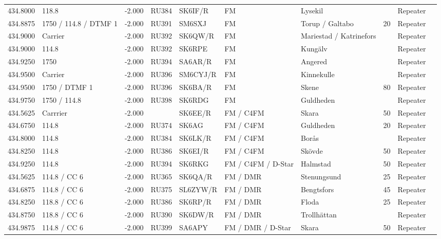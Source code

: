 \begin{longtable}{lllllllrlr}
434.8000&118.8&-2.000&RU384&SK6IF/R&FM&Lysekil&&Repeater&\\
434.8875&1750 / 114.8 / DTMF 1&-2.000&RU391&SM6SXJ&FM&Torup / Galtabo&20&Repeater&\\
434.9000&Carrier&-2.000&RU392&SK6QW/R&FM&Mariestad / Katrinefors&&Repeater&\\
434.9000&114.8&-2.000&RU392&SK6RPE&FM&Kungälv&&Repeater&\\
434.9250&1750&-2.000&RU394&SA6AR/R&FM&Angered&&Repeater&\\
434.9500&Carrier&-2.000&RU396&SM6CYJ/R&FM&Kinnekulle&&Repeater&\\
434.9500&1750 / DTMF 1&-2.000&RU396&SK6BA/R&FM&Skene&80&Repeater&\\
434.9750&1750 / 114.8&-2.000&RU398&SK6RDG&FM&Guldheden&&Repeater&\\
434.5625&Carrrier&-2.000&&SK6EE/R&FM / C4FM&Skara&50&Repeater&\\
434.6750&114.8&-2.000&RU374&SK6AG&FM / C4FM&Guldheden&20&Repeater&\\
434.8000&114.8&-2.000&RU384&SK6LK/R&FM / C4FM&Borås&&Repeater&\\
434.8250&114.8&-2.000&RU386&SK6EI/R&FM / C4FM&Skövde&50&Repeater&\\
434.9250&114.8&-2.000&RU394&SK6RKG&FM / C4FM / D-Star&Halmstad&50&Repeater&\\
434.5625&114.8 / CC 6&-2.000&RU365&SK6QA/R&FM / DMR&Stenungsund&25&Repeater&\\
434.6875&114.8 / CC 6&-2.000&RU375&SL6ZYW/R&FM / DMR&Bengtsfors&45&Repeater&\\
434.8250&118.8 / CC 6&-2.000&RU386&SK6RP/R&FM / DMR&Floda&25&Repeater&\\
434.8750&118.8 / CC 6&-2.000&RU390&SK6DW/R&FM / DMR&Trollhättan&&Repeater&\\
434.9875&114.8 / CC 6&-2.000&RU399&SA6APY&FM / DMR / D-Star&Skara&50&Repeater&\\
\end{longtable}
\clearpage
